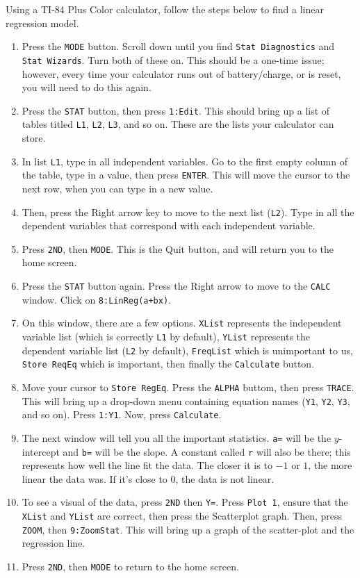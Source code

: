 \documentclass[lang=en,11pt]{elegantbook}
\begin{document}
Using a TI-84 Plus Color calculator, follow the steps below to find a linear regression model. \begin{enumerate}
    \item Press the \texttt{MODE} button.  Scroll down until you find \texttt{Stat Diagnostics} and \texttt{Stat Wizards}.  Turn both of these on.  This should be a one-time issue; however, every time your calculator runs out of battery/charge, or is reset, you will need to do this again.
    \item Press the \texttt{STAT} button, then press \texttt{1:Edit}. This should bring up a list of tables titled \texttt{L1}, \texttt{L2}, \texttt{L3}, and so on.  These are the lists your calculator can store.
    \item In list \texttt{L1}, type in all independent variables.  Go to the first empty column of the table, type in a value, then press \texttt{ENTER}.  This will move the cursor to the next row, when you can type in a new value.
    \item Then, press the Right arrow key to move to the next list (\texttt{L2}).  Type in all the dependent variables that correspond with each independent variable.
    \item Press \texttt{2ND}, then \texttt{MODE}.  This is the Quit button, and will return you to the home screen.
    \item Press the \texttt{STAT} button again. Press the Right arrow to move to the \texttt{CALC} window.  Click on \texttt{8:LinReg(a+bx)}.
    \item On this window, there are a few options.  \texttt{XList} represents the independent variable list (which is correctly \texttt{L1} by default), \texttt{YList} represents the dependent variable list (\texttt{L2} by default), \texttt{FreqList} which is unimportant to us, \texttt{Store ReqEq} which is important, then finally the \texttt{Calculate} button.
    \item Move your cursor to \texttt{Store RegEq}.  Press the \texttt{ALPHA} buttom, then press \texttt{TRACE}.  This will bring up a drop-down menu containing equation names (\texttt{Y1}, \texttt{Y2}, \texttt{Y3}, and so on).  Press \texttt{1:Y1}.  Now, press \texttt{Calculate}.
    \item The next window will tell you all the important statistics.  \texttt{a=} will be the $y$-intercept and \texttt{b=} will be the slope.  A constant called \texttt{r} will also be there; this represents how well the line fit the data.  The closer it is to $-1$ or $1$, the more linear the data was.  If it's close to $0$, the data is not linear.
    \item To see a visual of the data, press \texttt{2ND} then \texttt{Y=}.  Press \texttt{Plot 1}, ensure that the \texttt{XList} and \texttt{YList} are correct, then press the Scatterplot graph.  Then, press \texttt{ZOOM}, then \texttt{9:ZoomStat}.  This will bring up a graph of the scatter-plot and the regression line.
    \item Press \texttt{2ND}, then \texttt{MODE} to return to the home screen.
\end{enumerate}
\end{document}
